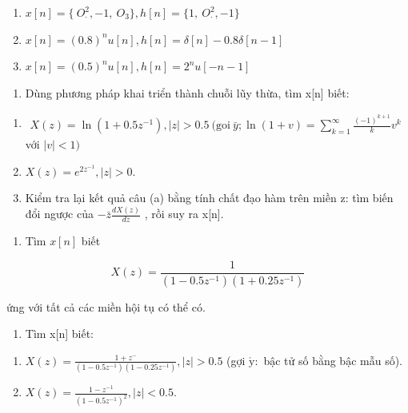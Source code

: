 \documentclass[
  10
]{article}
\providecommand{\tightlist}{%
  \setlength{\itemsep}{0pt}\setlength{\parskip}{0pt}}
\begin{document}
\begin{enumerate}
\def\labelenumi{(\alph{enumi})}
\item
  \(x [ n ] = \{ \ O _ { \cdot } ^ { 2 } , - 1 , \ O _ { 3 } \} , h [ n ] = \{ 1 , \ O _ { \cdot } ^ { 2 } , - 1 \}\)
\item
  \(x [ n ] = ( 0 . 8 ) ^ { n } u [ n ] , h [ n ] = \delta [ n ] - 0 . 8 \delta [ n - 1 ]\)
\item
  \(x [ n ] = ( 0 . 5 ) ^ { n } u [ n ] , h [ n ] = 2 ^ { n } u [ - n - 1 ]\)
\end{enumerate}

\begin{enumerate}
\def\labelenumi{\arabic{enumi}.}
\setcounter{enumi}{7}
\tightlist
\item
  Dùng phương pháp khai triển thành chuỗi lũy thừa, tìm x{[}n{]} biết:
\end{enumerate}

\begin{enumerate}
\def\labelenumi{(\alph{enumi})}
\item
  \(\begin{array} { r } { X ( z ) = \ln ( 1 + 0 . 5 z ^ { - 1 } ) , | z | > 0 . 5 \ ( \mathrm { g o i } \ \bar { y } ; \ln ( 1 + v ) = \sum _ { k = 1 } ^ { \infty } \frac { ( - 1 ) ^ { k + 1 } } { k } v ^ { k } } \end{array}\)
  với \(| v | < 1 )\)
\item
  \(X ( z ) = e ^ { 2 z ^ { - 1 } } , | z | > 0 .\)
\item
  Kiểm tra lại kết quả câu (a) bằng tính chất đạo hàm trên miền z: tìm
  biến đổi ngược của \(- \bar { z } \frac { d X ( z ) } { d z }\) , rồi
  suy ra x{[}n{]}.
\end{enumerate}

\begin{enumerate}
\def\labelenumi{\arabic{enumi}.}
\setcounter{enumi}{8}
\tightlist
\item
  Tìm \(x [ n ]\) biết
\end{enumerate}

\[
X (z) = \frac {1}{(1 - 0 . 5 z ^ {- 1}) (1 + 0 . 2 5 z ^ {- 1})}
\]

ứng với tất cả các miền hội tụ có thể có.

\begin{enumerate}
\def\labelenumi{\arabic{enumi}.}
\setcounter{enumi}{9}
\tightlist
\item
  Tìm x{[}n{]} biết:
\end{enumerate}

\begin{enumerate}
\def\labelenumi{(\alph{enumi})}
\item
  \(X ( z ) = \frac { 1 + z ^ { - } } { ( 1 - 0 . 5 z ^ { - 1 } ) ( 1 - 0 . 2 5 z ^ { - 1 } ) } , | z | > 0 . 5\)
  (gợi \(\acute { \mathrm { y } } { : }\) bậc tử số bằng bậc mẫu số).
\item
  \(X ( z ) = \frac { 1 - z ^ { - 1 } } { ( 1 - 0 . 5 z ^ { - 1 } ) ^ { 2 } } , | z | < 0 . 5 .\)
\end{enumerate}
\end{document}
